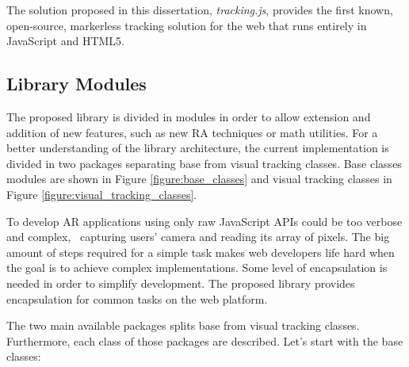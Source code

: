 The solution proposed in this dissertation, \textit{tracking.js}, provides the first known, open-source, markerless tracking solution for the web that runs entirely in JavaScript and HTML5.


\subsection{Library Modules} %
\label{sub:tracking_library_for_the_web:library_modules}

The proposed library is divided in modules in order to allow extension and addition of new features, such as new RA techniques or math utilities. For a better understanding of the library architecture, the current implementation is divided in two packages separating base from visual tracking classes. Base classes modules are shown in Figure \ref{figure:base_classes} and visual tracking classes in Figure \ref{figure:visual_tracking_classes}.

To develop AR applications using only raw JavaScript APIs \cite{MDN2013} could be too verbose and complex, \eg\ capturing users' camera and reading its array of pixels. The big amount of steps required for a simple task makes web developers life hard when the goal is to achieve complex implementations. Some level of encapsulation is needed in order to simplify development. The proposed library provides encapsulation for common tasks on the web platform.

The two main available packages splits base from visual tracking classes. Furthermore, each class of those packages are described. Let's start with the base classes:

